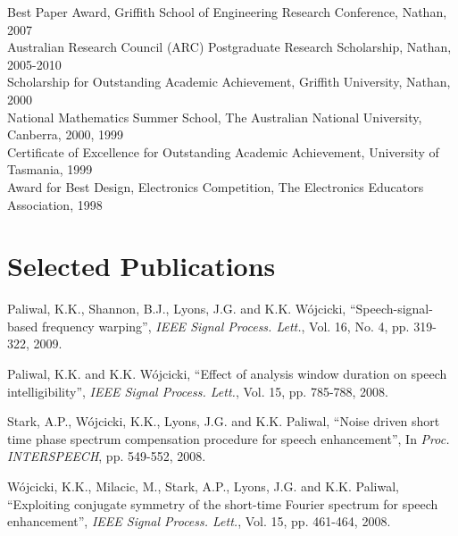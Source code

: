\documentclass[margin,line]{resume}
\begin{document}
\begin{resume}
    Best Paper Award, Griffith School of Engineering Research Conference, Nathan, 2007              \vspace{1mm}\\%
    Australian Research Council (ARC) Postgraduate Research Scholarship, Nathan, 2005-2010          \vspace{1mm}\\%
    Scholarship for Outstanding Academic Achievement, Griffith University, Nathan, 2000             \vspace{1mm}\\%
    National Mathematics Summer School, The Australian National University, Canberra, 2000, 1999    \vspace{1mm}\\%
    Certificate of Excellence for Outstanding Academic Achievement, University of Tasmania, 1999    \vspace{1mm}\\%
    Award for Best Design, Electronics Competition, The Electronics Educators Association, 1998


    \section{\mysidestyle Selected Publications}

    Paliwal, K.K., Shannon, B.J., Lyons, J.G. and K.K. W\'ojcicki,
    ``Speech-signal-based frequency warping'',
    \textsl{IEEE Signal Process. Lett.}, Vol. 16, No. 4, pp. 319-322, 2009.

\vspace{-2mm}
    Paliwal, K.K. and K.K. W\'ojcicki,
    ``Effect of analysis window duration on speech intelligibility'',
    \textsl{IEEE Signal Process. Lett.}, Vol. 15, pp. 785-788, 2008.

\vspace{-2mm}
    Stark, A.P., W\'ojcicki, K.K., Lyons, J.G. and K.K. Paliwal,
    ``Noise driven short time phase spectrum compensation procedure for speech enhancement'',
    In \textsl{Proc. INTERSPEECH}, pp. 549-552, 2008.

\vspace{-2mm}
    W\'ojcicki, K.K., Milacic, M., Stark, A.P., Lyons, J.G. and K.K. Paliwal,
    ``Exploiting conjugate symmetry of the short-time Fourier spectrum for speech enhancement'',
    \textsl{IEEE Signal Process. Lett.}, Vol. 15, pp. 461-464, 2008.


\end{resume}
\end{document}
